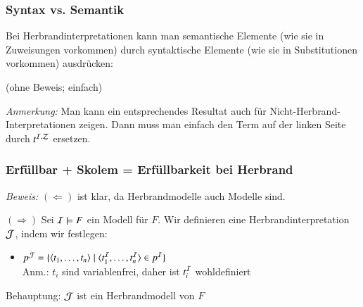 \documentclass[aspectratio=1610,onlymath]{beamer}
\begin{document}
\begin{frame}\frametitle{Syntax vs. Semantik}

Bei Herbrandinterpretationen kann man semantische Elemente (wie sie in Zuweisungen vorkommen) durch syntaktische Elemente (wie sie in Substitutionen vorkommen) ausdrücken:\medskip


(ohne Beweis; einfach)
\bigskip

{\color{devilscss}\footnotesize \emph{Anmerkung:} Man kann ein entsprechendes Resultat auch für Nicht-Herbrand-Interpretationen zeigen. Dann muss man einfach den Term auf der linken Seite durch $t^{\mathcal{I},\mathcal{Z}}$ ersetzen.}

\end{frame}

\begin{frame}\frametitle{Erfüllbar + Skolem = Erfüllbarkeit bei Herbrand}

\pause

\emph{Beweis:} $(\Leftarrow)$ ist klar, da Herbrandmodelle auch Modelle sind.\bigskip\pause

$(\Rightarrow)$ Sei $\mathcal{I}\models F$ ein Modell für $F$. Wir definieren eine Herbrandinterpretation $\mathcal{J}$, indem wir festlegen:
\begin{itemize}
\item $p^{\mathcal{J}}=\{\langle{t_1,\ldots,t_n}\rangle\mid\langle{t_1^{\mathcal{I}},\ldots,t_n^{\mathcal{I}}}\rangle\in p^{\mathcal{I}}\}$\\
{\footnotesize Anm.: $t_i$ sind variablenfrei, daher ist $t_i^{\mathcal{I}}$ wohldefiniert}
\end{itemize}
Behauptung: \alert{$\mathcal{J}$ ist ein Herbrandmodell von $F$}

\end{frame}
\end{document}
